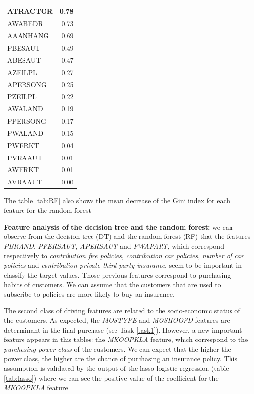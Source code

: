 \documentclass[
  12pt,
  oneside]{report}
\begin{document}
\begin{table}[H]
\begin{tabular}[t]{l|r}
\hline
ATRACTOR & 0.78\\
\hline
AWABEDR & 0.73\\
\hline
AAANHANG & 0.69\\
\hline
PBESAUT & 0.49\\
\hline
ABESAUT & 0.47\\
\hline
AZEILPL & 0.27\\
\hline
APERSONG & 0.25\\
\hline
PZEILPL & 0.22\\
\hline
AWALAND & 0.19\\
\hline
PPERSONG & 0.17\\
\hline
PWALAND & 0.15\\
\hline
PWERKT & 0.04\\
\hline
PVRAAUT & 0.01\\
\hline
AWERKT & 0.01\\
\hline
AVRAAUT & 0.00\\
\hline
\end{tabular}
\end{table}

The table \ref{tab:RF} also shows the mean decrease of the Gini index for each feature for the random forest.

\textbf{Feature analysis of the decision tree and the random forest:} we can observe from the decision tree (DT) and the random forest (RF) that the features \emph{PBRAND}, \emph{PPERSAUT}, \emph{APERSAUT} and \emph{PWAPART}, which correspond respectively to \emph{contribution fire policies}, \emph{contribution car policies}, \emph{number of car policies} and \emph{contribution private third party insurance}, seem to be important in classify the target values. Those previous features correspond to purchasing habits of customers. We can assume that the customers that are used to subscribe to policies are more likely to buy an insurance.

The second class of driving features are related to the socio-economic status of the customers. As expected, the \emph{MOSTYPE} and \emph{MOSHOOFD} features are determinant in the final purchase (see Task \ref{task1}). However, a new important feature appears in this tables: the \emph{MKOOPKLA} feature, which correspond to the \emph{purchasing power class} of the customers. We can expect that the higher the power class, the higher are the chance of purchasing an insurance policy. This assumption is validated by the output of the lasso logistic regression (table \ref{tab:lasso}) where we can see the positive value of the coefficient for the \emph{MKOOPKLA} feature.
\end{document}
